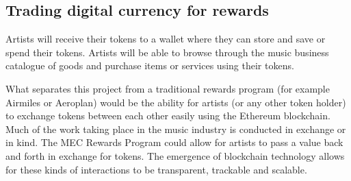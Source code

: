 \documentclass[12pt,tightenlines,letterpaper]{scrartcl}
\begin{document}

 	
 \subsection{Trading digital currency for rewards}
 
 Artists will receive their tokens to a wallet where they can store and save or spend their tokens. Artists will be able to browse through the music business catalogue of goods and purchase items or services using their tokens. 
 
 What separates this project from a traditional rewards program (for example Airmiles or Aeroplan) would be the ability for artists (or any other token holder) to exchange tokens between each other easily using the Ethereum blockchain. Much of the work taking place in the music industry is conducted in exchange or in kind. The MEC Rewards Program could allow for artists to pass a value back and forth in exchange for tokens. The emergence of blockchain technology allows for these kinds of interactions to be transparent, trackable and scalable. 
 
\end{document}
